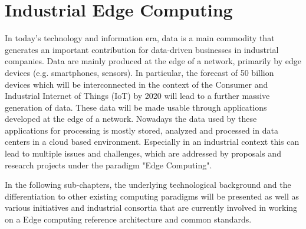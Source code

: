 \section{Industrial Edge Computing}\label{sec:background}
In today's technology and information era, data is a main commodity that generates an important contribution for data-driven businesses in industrial companies. Data are mainly produced at the edge of a network, primarily by edge devices (e.g. smartphones, sensors). In particular, the forecast of 50 billion devices which will be interconnected in the context of the Consumer and Industrial Internet of Things (IoT) by 2020 will lead to a further massive generation of data. These data will be made usable through applications developed at the edge of a network. Nowadays the data used by these applications for processing is mostly stored, analyzed and processed in data centers in a cloud based environment. Especially in an industrial context this can lead to multiple issues and challenges, which are addressed by proposals and research projects under the paradigm "Edge Computing".\par
In the following sub-chapters, the underlying technological background and the differentiation to other existing computing paradigms will be presented as well as various initiatives and industrial consortia that are currently involved in working on a Edge computing reference architecture and common standards.

